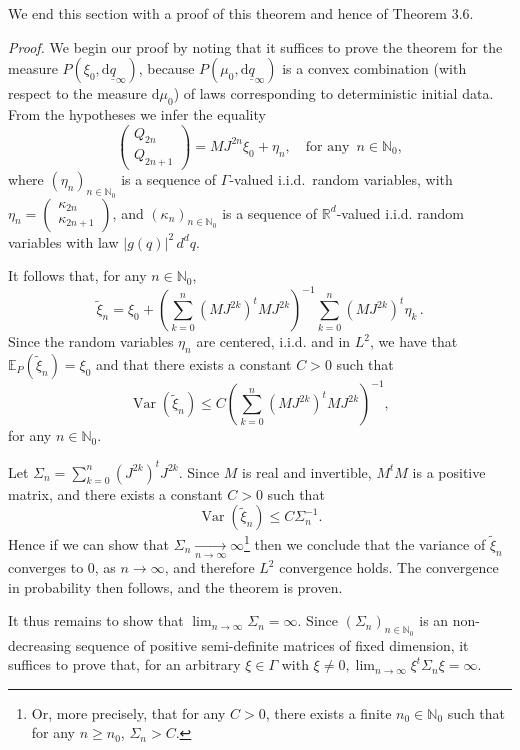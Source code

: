 \documentclass[11pt]{article}
\begin{document}
We end this section with a proof of this theorem and hence of Theorem 3.6. 

\noindent \textit{Proof.} We begin our proof by noting that it suffices to prove the theorem for the measure 
$P(\xi_0,\text{d}\underline{q}_\infty)$, because $P(\mu_0,\text{d}\underline{q}_\infty)$ is a convex combination 
(with respect to the measure $\text{d}\mu_0$) of laws corresponding to deterministic initial data.
	From the hypotheses we infer the equality
	$$\begin{pmatrix}Q_{2n} \\ Q_{2n+1}\end{pmatrix}= MJ^{2n} \xi_0 + \eta_n, \quad \text{for any }\,n\in \mathbb N_0, $$
where $(\eta_n)_{n\in \mathbb N_0}$ is a sequence of $\Gamma$-valued i.i.d.~random variables, with 
$\eta_n=\begin{pmatrix}\kappa_{2n} \\ \kappa_{2n+1}\end{pmatrix}$, and $(\kappa_n)_{n\in \mathbb N_0}$ 
is a sequence of $\mathbb R^d$-valued i.i.d. random variables with law $\vert g(q)\vert^{2}\, d^{d}q$.

	It follows that, for any $n\in \mathbb N_0$,
	$$\tilde \xi_n= \xi_0+\left(\sum_{k=0}^n(MJ^{2k})^{t}MJ^{2k}\right)^{-1}\sum_{k=0}^n (MJ^{2k})^{t}\eta_k\,.$$
	Since the random variables $\eta_n$ are centered, i.i.d. and in $L^2$, we have that $\mathbb E_P(\tilde \xi_n)=\xi_0$ and that there exists a constant $C>0$ such that 
	$$\operatorname{Var}(\tilde \xi_n)\leq C\left(\sum_{k=0}^n(MJ^{2k})^{t}MJ^{2k}\right)^{-1},$$
	for any $n\in \mathbb N_0$.

	Let $\Sigma_n=\sum_{k=0}^n (J^{2k})^{t}J^{2k}$. Since $M$ is real and invertible, $M^{t}M$ is a positive matrix, 
	and there exists a constant $C>0$ such that
	$$\operatorname{Var}(\tilde \xi_n)\leq C \Sigma_n^{-1}.$$
	Hence if we can show that $\Sigma_n \underset{n\to\infty}{\rightarrow} \infty$\footnote{Or, more precisely, that for any $C>0$, there exists a finite $n_0\in \mathbb N_0$ such that for any $n\geq n_0$, $\Sigma_n> C$.} then we conclude that
	the variance of $\tilde{\xi}_n$ converges to 0, as $n\rightarrow \infty$, and therefore $L^2$ convergence holds. 
	The convergence in probability then follows, and the theorem is proven.	
	
	It thus remains to show that $\lim_{n\to\infty}\Sigma_n=\infty$. Since $(\Sigma_n)_{n \in \mathbb{N}_0}$ is an 
	non-decreasing sequence of positive semi-definite matrices of fixed dimension, it suffices to prove that, for an arbitrary 
	$\xi\in \Gamma$ with $\xi \neq 0, \lim_{n\rightarrow \infty} \xi^t\Sigma_n\xi =\infty$. 
	
\end{document}
